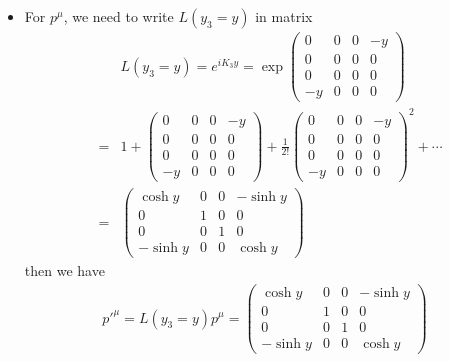 \documentclass[11pt]{article}
\begin{document}
\section{ }
\begin{itemize}
    \item For $p^\mu$, we need to write $L(y_3=y)$ in matrix
    \begin{eqnarray}
        &&L(y_3 = y)
        = e^{ i K_3 y }= \exp
        {\begin{pmatrix}
            0 & 0 & 0 & -y \\
            0 & 0 & 0 & 0 \\
            0 & 0 & 0 & 0 \\
            -y & 0 & 0 & 0 
        \end{pmatrix}}\\
        &=&
        1+
        \begin{pmatrix}
            0 & 0 & 0 & -y \\
            0 & 0 & 0 & 0 \\
            0 & 0 & 0 & 0 \\
            -y & 0 & 0 & 0 
        \end{pmatrix}
        +\frac{1}{2!}\begin{pmatrix}
            0 & 0 & 0 & -y \\
            0 & 0 & 0 & 0 \\
            0 & 0 & 0 & 0 \\
            -y & 0 & 0 & 0 
        \end{pmatrix}^2
        +\cdots \\
        &=&
        \begin{pmatrix}
            \cosh y & 0 & 0 & -\sinh y \\
            0 & 1 & 0 & 0 \\
            0 & 0 & 1 & 0 \\
            -\sinh y & 0 & 0 & \cosh y
        \end{pmatrix}
      \end{eqnarray}
    then we have
    \begin{eqnarray}
        {p'}^\mu = L(y_3 = y) p^\mu =
        \begin{pmatrix}
            \cosh y & 0 & 0 & -\sinh y \\
            0 & 1 & 0 & 0 \\
            0 & 0 & 1 & 0 \\
            -\sinh y & 0 & 0 & \cosh y
        \end{pmatrix}

\end{eqnarray}
\end{itemize}
\end{document}
